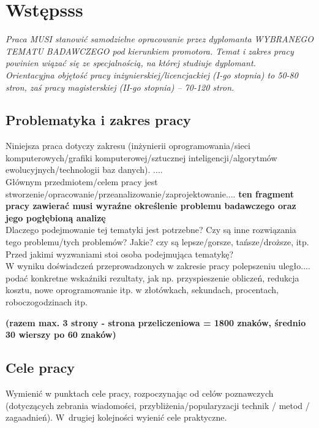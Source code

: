 \documentclass[12pt]{report}
\begin{document}
\tableofcontents	%

\chapter{Wstępsss} \label{rozdz.wstep} 
{\em Praca MUSI stanowić samodzielne opracowanie przez dyplomanta WYBRANEGO TE\-MATU
BADAWCZEGO pod kierunkiem promotora. 
Temat i zakres pracy powinien wiązać się ze specjalnością, na której studiuje
dyplomant.\\
\indent Orientacyjna objętość pracy inżynierskiej/licencjackiej (I-go stopnia)
to 50-80 stron, zaś pracy magisterskiej (II-go stopnia) -- 70-120 stron.}

\section{Problematyka i zakres pracy}
Niniejsza praca dotyczy zakresu (inżynierii oprogramowania/sieci
komputero\-wych/gra\-fiki komputerowej/sztucznej inteligencji/algorytmów ewolucyjnych/technologii baz danych). ....\\
\indent Głównym przedmiotem/celem pracy jest
stworzenie/opracowanie/przeanalizo\-wanie/zaprojektowanie.... {\bf ten fragment
pracy zawierać musi wyraźne określenie problemu badawczego oraz jego pogłębioną
analizę}\\

\indent Dlaczego podejmowanie tej tematyki jest potrzebne? Czy są inne
rozwiązania tego problemu/tych problemów? Jakie? czy są lepsze/gorsze,
tańsze/droższe, itp.
\indent Przed jakimi wyzwaniami stoi osoba podejmująca tematykę? \\
 W wyniku doświadczeń przeprowadzonych w zakresie pracy polepszeniu
uległo.... podać konkretne wskaźniki rezultaty, jak np. przyspieszenie obliczeń,
redukcja kosztu, nowe oprogramowanie itp. w złotówkach, sekundach, procentach,
roboczogodzinach itp. 

{\bf (razem max. 3 strony - strona przeliczeniowa = 1800 znaków, średnio 30
wierszy po 60 znaków)}

\section{Cele pracy}
Wymienić w punktach cele pracy, rozpoczynając od celów poznawczych (dotyczą\-cych
zebrania wiadomości, przybliżenia/popularyzacji technik / metod / zagaadnień).
W~drugiej kolejności wyienić cele praktyczne.
\end{document}
